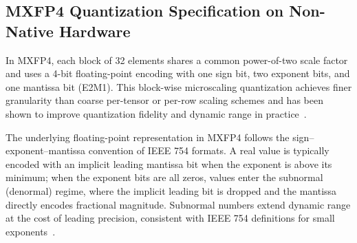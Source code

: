 \subsection{MXFP4 Quantization Specification on Non-Native Hardware}

In MXFP4, each block of 32 elements shares a common power-of-two scale factor and uses a 4-bit floating-point encoding with one sign bit, two exponent bits, and one mantissa bit (E2M1). This block-wise microscaling quantization achieves finer granularity than coarse per-tensor or per-row scaling schemes and has been shown to improve quantization fidelity and dynamic range in practice~\cite{ocp_mx_specification, micro_quant_arxiv}.

The underlying floating-point representation in MXFP4 follows the sign–exponent–mantissa convention of IEEE 754 formats. A real value is typically encoded with an implicit leading mantissa bit when the exponent is above its minimum; when the exponent bits are all zeros, values enter the subnormal (denormal) regime, where the implicit leading bit is dropped and the mantissa directly encodes fractional magnitude. Subnormal numbers extend dynamic range at the cost of leading precision, consistent with IEEE 754 definitions for small exponents~\cite{ieee754_floating_point}.


